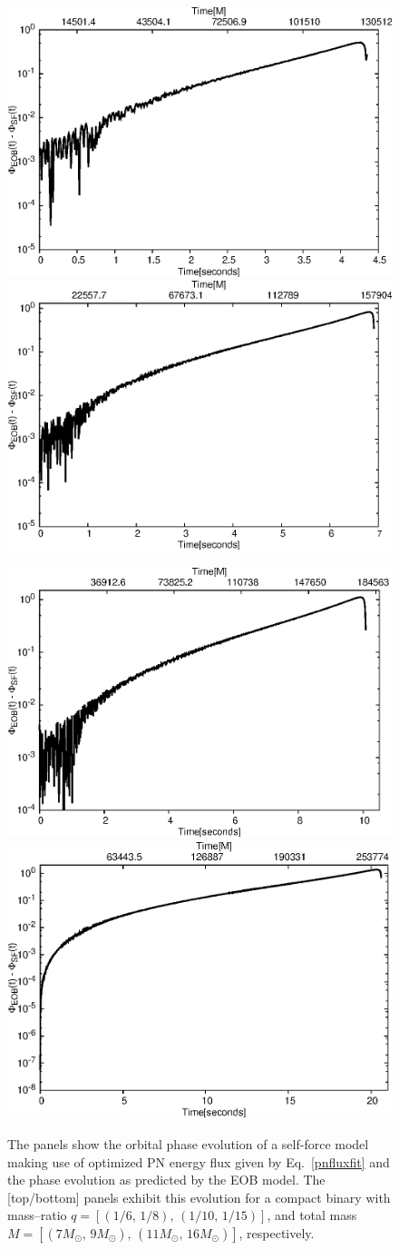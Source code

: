  \begin{figure}%
\centerline{
\includegraphics[height=0.4\textwidth,  clip]{figures/imrimri/phsiffeobsfm1m6.eps}
\includegraphics[height=0.4\textwidth,  clip]{figures/imrimri/phsiffeobsfm1m8.eps}
}
\centerline{
\includegraphics[height=0.4\textwidth,  clip]{figures/imrimri/phsiffeobsfm1m10.eps}
\includegraphics[height=0.4\textwidth,  clip]{figures/imrimri/phsiffeobsfm1m15.eps}
}
\caption{The panels show the orbital phase evolution of a self-force model making use of optimized PN energy flux given by Eq.~\eqref{pnfluxfit} and the phase evolution as predicted by the EOB model. The [top/bottom] panels exhibit this evolution for a compact binary with mass--ratio \(q=[(1/6,\,1/8), \,( 1/10,\,1/15)]\), and total mass \(M=[ (7M_{\odot} ,\, 9M_{\odot} ), \, ( 11M_{\odot},\, 16M_{\odot})  ]\), respectively. }
\label{PNoptimized}
\end{figure}

